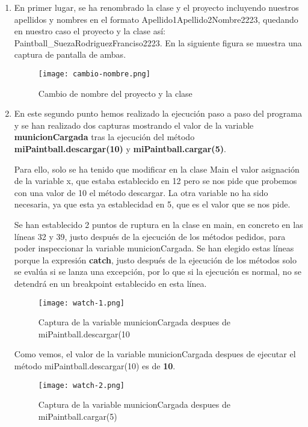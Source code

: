 \begin{enumerate}
    \item En primer lugar, se ha renombrado la clase y el proyecto incluyendo nuestros apellidos y nombres en el formato Apellido1Apellido2Nombre2223, quedando en nuestro caso el proyecto y la clase así: Paintball\_SuezaRodriguezFranciso2223. En la siguiente figura se muestra una captura de pantalla de ambas.

    \begin{figure}[H]
        \centering
        \texttt{[image: cambio-nombre.png]}
        \caption{Cambio de nombre del proyecto y la clase}
    \end{figure}

    \item En este segundo punto hemos realizado la ejecución paso a paso del programa y se han realizado dos capturas mostrando el valor de la variable \textbf{municionCargada} tras la ejecución del método \textbf{miPaintball.descargar(10)} y \textbf{miPaintball.cargar(5)}.

    Para ello, solo se ha tenido que modificar en la clase Main el valor asignación de la variable x, que estaba establecido en 12 pero se nos pide que probemos con una valor de 10 el método descargar. La otra variable no ha sido necesaria, ya que esta ya establecidad en 5, que es el valor que se nos pide.

    Se han establecido 2 puntos de ruptura en la clase en main, en concreto en las líneas 32 y 39, justo después de la ejecución de los métodos pedidos, para poder inspeccionar la variable municionCargada. Se han elegido estas líneas porque la expresión \textbf{catch}, justo después de la ejecución de los métodos solo se evalúa si se lanza una excepción, por lo que si la ejecución es normal, no se detendrá en un breakpoint establecido en esta línea.

     \begin{figure}[ht]
        \centering
        \texttt{[image: watch-1.png]}
        \caption{Captura de la variable municionCargada despues de miPaintball.descargar(10}
    \end{figure}

    Como vemos, el valor de la variable municionCargada despues de ejecutar el método miPaintball.descargar(10) es de \textbf{10}.

    \begin{figure}[ht]
        \centering
        \texttt{[image: watch-2.png]}
        \caption{Captura de la variable municionCargada despues de miPaintball.cargar(5)}
    \end{figure}


\end{enumerate}
